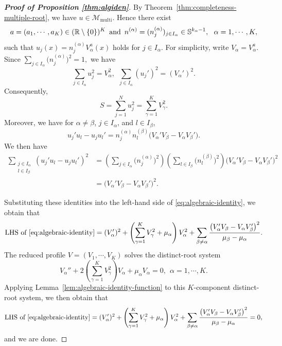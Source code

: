 \documentclass[11pt]{article}
\numberwithin{equation}{section}
\theoremstyle{definition}
\begin{document}
\begin{proof}[\normalfont \bfseries Proof of Proposition \ref{thm:algiden}]
By Theorem~\ref{thm:completeness-multiple-root}, we have
\(u\in\mathcal M_{\mathrm{multi}}\). Hence there exist
\[
a=(a_1,\cdots,a_K)\in(\mathbb R\setminus\{0\})^K\,\ \hbox{and}\,\ n^{(\alpha)}
=
(n_j^{(\alpha)})_{j\in I_\alpha}
\in\mathbb S^{k_\alpha-1},
\ \  \alpha=1,\cdots,K,
\]
such that
$
u_j(x)=n_j^{(\alpha)}V_\alpha^a(x)
$ holds for $j\in I_\alpha$.
For simplicity, write \(V_\alpha=V_\alpha^a\). Since
$
\sum_{j\in I_\alpha}\bigl(n_j^{(\alpha)}\bigr)^2=1,
$
we have
\[
\sum_{j\in I_\alpha}u_j^2=V_\alpha^2,
\ \
\sum_{j\in I_\alpha}(u_j')^2=(V_\alpha')^2.
\]
Consequently,
\[
S=\sum_{j=1}^N u_j^2
=
\sum_{\gamma=1}^K V_\gamma^2.
\]
Moreover, we have for \(\alpha\neq\beta\), \(j\in I_\alpha\), and
\(l\in I_\beta\),
\[
u_j'u_l-u_ju_l'
=
n_j^{(\alpha)}n_l^{(\beta)}
\bigl(V_\alpha'V_\beta-V_\alpha V_\beta'\bigr).
\]
We then have
\[
\begin{aligned}
	\sum_{\substack{j\in I_\alpha\\ l\in I_\beta}}
	(u_j'u_l-u_ju_l')^2
	&  =
	\left(
	\sum_{j\in I_\alpha}
	\bigl(n_j^{(\alpha)}\bigr)^2
	\right)
	\left(
	\sum_{l\in I_\beta}
	\bigl(n_l^{(\beta)}\bigr)^2
	\right)
	\bigl(V_\alpha'V_\beta-V_\alpha V_\beta'\bigr)^2  \\
	&  =
	\bigl(V_\alpha'V_\beta-V_\alpha V_\beta'\bigr)^2 .
\end{aligned}
\]

Substituting these identities into the left-hand side of
\eqref{eq:algebraic-identity}, we obtain that
\[
\mbox{LHS  of \eqref{eq:algebraic-identity}}= (V_\alpha')^2
+
\left(
\sum_{\gamma=1}^K V_\gamma^2+\mu_\alpha
\right)V_\alpha^2
+
\sum_{\beta\neq\alpha}
\frac{
	\bigl(V_\alpha'V_\beta-V_\alpha V_\beta'\bigr)^2
}{\mu_\beta-\mu_\alpha}.
\]
The reduced profile
$
V=(V_1,\cdots,V_K)
$
solves the distinct-root system
\[
V_\alpha''
+
2\left(\sum_{\gamma=1}^K V_\gamma^2\right)V_\alpha
+
\mu_\alpha V_\alpha
=0,
\ \  \alpha=1,\cdots,K.
\]
Applying Lemma~\ref{lem:algebraic-identity-function} to this
\(K\)-component distinct-root system, we then obtain that
\[
\mbox{LHS  of \eqref{eq:algebraic-identity}}= (V_\alpha')^2
+
\left(
\sum_{\gamma=1}^K V_\gamma^2+\mu_\alpha
\right)V_\alpha^2
+
\sum_{\beta\neq\alpha}
\frac{
	\bigl(V_\alpha'V_\beta-V_\alpha V_\beta'\bigr)^2
}{\mu_\beta-\mu_\alpha}
=0,
\]
and we are done.
\end{proof}
\end{document}
